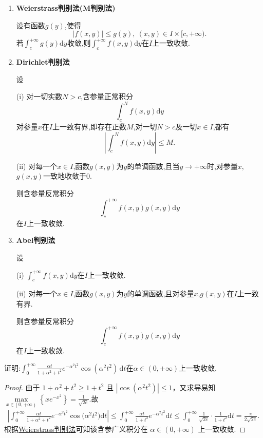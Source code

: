 \documentclass[../../main.tex]{subfiles}%
\begin{document}
\begin{theorem}[含参量反常积分一致收敛判别法]\label{theorem:含参量反常积分一致收敛判别法}
\begin{enumerate}
\item\label{theorem:含参积分Weierstrass判别法(M判别法)} \textbf{Weierstrass判别法(M判别法)} 

设有函数$g(y)$,使得
\[
|f(x,y)| \leqslant g(y),\ (x,y) \in I \times [c, +\infty).
\]
若$\int_{c}^{+\infty} g(y)\mathrm{d}y$收敛,则$\int_{c}^{+\infty} f(x,y)\mathrm{d}y$在$I$上一致收敛.

\item \textbf{Dirichlet判别法} 

设

(i) 对一切实数$N > c$,含参量正常积分
\[
\int_{c}^{N} f(x,y)\mathrm{d}y
\]
对参量$x$在$I$上一致有界,即存在正数$M$,对一切$N > c$及一切$x \in I$,都有
\[
\left| \int_{c}^{N} f(x,y)\mathrm{d}y \right| \leqslant M.
\]

(ii) 对每一个$x \in I$,函数$g(x,y)$为$y$的单调函数,且当$y \to +\infty$时,对参量$x$,$g(x,y)$一致地收敛于0.

则含参量反常积分
\[
\int_{c}^{+\infty} f(x,y)g(x,y)\mathrm{d}y
\]
在$I$上一致收敛.

\item \textbf{Abel判别法} 

设

(i) $\int_{c}^{+\infty} f(x,y)\mathrm{d}y$在$I$上一致收敛.

(ii) 对每一个$x \in I$,函数$g(x,y)$为$y$的单调函数,且对参量$x$,$g(x,y)$在$I$上一致有界.

则含参量反常积分
\[
\int_{c}^{+\infty} f(x,y)g(x,y)\mathrm{d}y
\]
在$I$上一致收敛.
\end{enumerate}
\end{theorem}

\begin{example}
证明:$\int_0^{+\infty}{\frac{\alpha t}{1+\alpha ^2+t^2}e^{-\alpha ^2t^2}\cos \left( \alpha ^2t^2 \right) \,\mathrm{d}t}$在$\alpha \in \left( 0,+\infty \right)$上一致收敛.
\end{example}
\begin{proof}

由于 \(1+\alpha^2+t^2 \geqslant 1+t^2\) 且 \(|\cos(\alpha^2 t^2)| \leqslant 1\)，又求导易知$\underset{x\in \left[ 0,+\infty \right)}{\max}\left\{ xe^{-x^2} \right\} =\frac{1}{\sqrt{2e}}.$故
\begin{align*}
\left| \int_0^{+\infty}{\frac{\alpha t}{1+\alpha ^2+t^2}e^{-\alpha ^2t^2}\cos\mathrm{(}\alpha ^2t^2)\mathrm{d}t} \right|\leqslant \int_0^{+\infty}{\frac{\alpha t}{1+t^2}e^{-\alpha ^2t^2}\mathrm{d}t}\leqslant \int_0^{+\infty}{\frac{1}{\sqrt{2e}}}\cdot \frac{1}{1+t^2}\mathrm{d}t=\frac{\pi}{2\sqrt{2e}}.
\end{align*}
根据\hyperref[theorem:含参量反常积分一致收敛判别法]{Weierstrass判别法}可知该含参广义积分在 \(\alpha \in (0, +\infty)\) 上一致收敛.
\end{proof}
\end{document}
